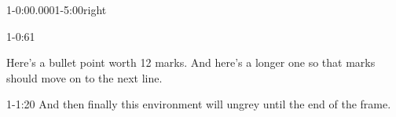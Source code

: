 


\begin{vsvframe}{1-0:00.000}{1-5:00}{right}

\begin{vsvgrey}{}{1-0:61}
\lipsum[66]
\end{vsvgrey}

\begin{itemize}
\lipsum[68]
\lipsum[75]
Here's a bullet point worth 12 marks.
And here's a longer one so that marks should move on to the next line.
\end{itemize}

\begin{vsvgrey}{}{1-1:20}
And then finally this environment will ungrey until the end of the frame.
\end{vsvgrey}

\end{vsvframe}
